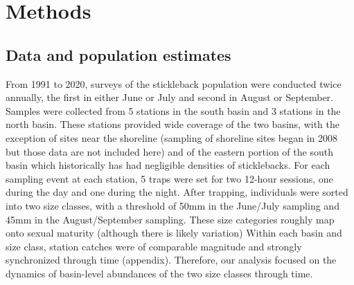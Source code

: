 \section*{Methods} 



\subsection*{Data and population estimates} 

From 1991 to 2020, surveys of the stickleback population were conducted twice annually, 
the first in either June or July and second in August or September. 
Samples were collected from 5 stations in the south basin and 3 stations in the north basin.
These stations provided wide coverage of the two basins, 
with the exception of sites near the shoreline 
(sampling of shoreline sites began in 2008 but those data are not included here)
and of the eastern portion of the south basin which historically has had negligible 
densities of sticklebacks.
For each sampling event at each station, 
5 traps were set for two 12-hour sessions, 
one during the day and one during the night.
After trapping, individuals were sorted into two size classes,
with a threshold of 50mm in the June/July sampling and 45mm in the August/September sampling.
These size categories roughly map onto sexual maturity (although there is likely variation)
Within each basin and size class, 
station catches were of comparable magnitude and 
strongly synchronized through time (appendix).
Therefore, our analysis focused on the dynamics of basin-level abundances
of the two size classes through time.

